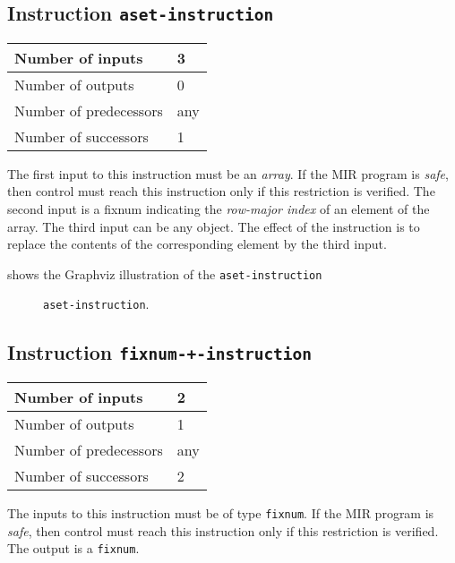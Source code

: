 \subsection{Instruction \texttt{aset-instruction}}
\label{mir-instruction-aset}

\begin{tabular}{|l|l|}
\hline
Number of inputs & 3\\
\hline
Number of outputs & 0\\
\hline
Number of predecessors & any\\
\hline
Number of successors & 1\\
\hline
\end{tabular}

The first input to this instruction must be an \emph{array}.  If the
MIR program is \emph{safe}, then control must reach this instruction
only if this restriction is verified.  The second input is a fixnum
indicating the \emph{row-major index} of an element of the array.
The third input can be any object.  The effect of the instruction is
to replace the contents of the corresponding element by the third input.

 shows the Graphviz illustration of the
\texttt{aset-instruction}

\begin{figure}
\begin{center}
\end{center}
\caption{\label{fig-aset-instruction}
\texttt{aset-instruction}.}
\end{figure}

\subsection{Instruction \texttt{fixnum-+-instruction}}
\label{mir-instruction-fixnum-+}

\begin{tabular}{|l|l|}
\hline
Number of inputs & 2\\
\hline
Number of outputs & 1\\
\hline
Number of predecessors & any\\
\hline
Number of successors & 2\\
\hline
\end{tabular}

The inputs to this instruction must be of type \texttt{fixnum}.  If the
MIR program is \emph{safe}, then control must reach this instruction
only if this restriction is verified.  The output is a
\texttt{fixnum}.  

